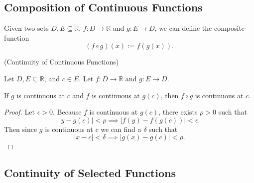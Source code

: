 \subsection{Composition of Continuous Functions}

Given two sets $D, E \subseteq \mathbb{R}$, $f : D \rightarrow \mathbb{R}$ and $g : E \rightarrow D$, we can define the composite function \[(f \circ g)(x) := f(g(x)).\]

\begin{theorem} (Continuity of Continuous Functions)

  Let $D, E \subseteq \mathbb{R}$, and $c \in E$. Let $f : D \rightarrow \mathbb{R}$ and $g : E \rightarrow D$.

  If $g$ is continuous at $c$ and $f$ is continuous at $g(c)$, then $f \circ g$ is continuous at $c$.
    
\end{theorem}
\begin{proof}
    Let $\epsilon > 0$. Because $f$ is continuous at $g(c)$, there exists $\rho > 0$ such that
    \[|y - g(c)| < \rho \implies |f(y) - f(g(c))| < \epsilon.\]
    Then since $g$ is continuous at $c$ we can find a $\delta$ such that
    \[|x - c| < \delta \implies |g(x) - g(c)| < \rho.\]
\end{proof}

\subsection{Continuity of Selected Functions}

